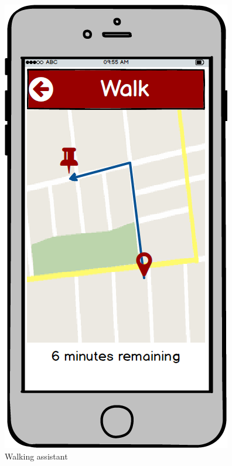 \begin{figure}[!htb]
\begin{minipage}[b]{0.3\textwidth}
	\includegraphics[scale=0.3]{images/walk}
	\caption{Walking assistant}
	\label{ref:walk}
\end{minipage}
\hfill
\begin{minipage}[b]{0.3\textwidth}
	\centering

\end{minipage}
\end{figure}
